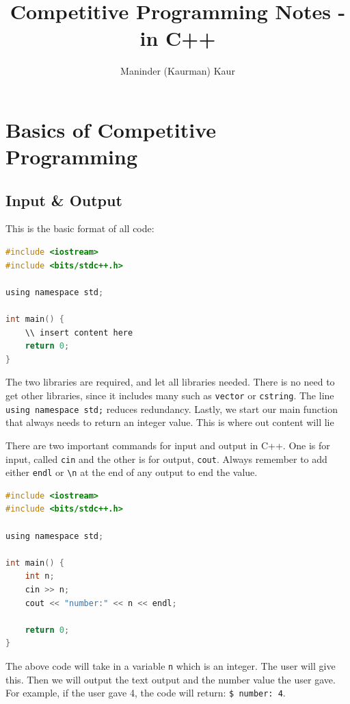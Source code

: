 \documentclass[11pt]{article}
\title{Competitive Programming Notes - in C++}
\author{Maninder (Kaurman) Kaur}
\begin{document}
\maketitle

\section{Basics of Competitive Programming}
\underline{\hspace{10cm}}

\subsection{Input \& Output}
This is the basic format of all code:
\begin{lstlisting}[language=c, mathescape=true]
#include <iostream>
#include <bits/stdc++.h>

using namespace std;

int main() {
    \\ insert content here
    return 0;
}
\end{lstlisting}

\noindent The two libraries are required, and let all libraries needed. There is no need to get other libraries, since it includes many such as \texttt{vector} or \texttt{cstring}. The line \texttt{using namespace std;} reduces redundancy. Lastly, we start our main function that always needs to return an integer value. This is where out content will lie 


\noindent There are two important commands for input and output in C++. One is for input, called \texttt{cin} and the other is for output, \texttt{cout}. Always remember to add either \texttt{endl} or \texttt{\textbackslash n} at the end of any output to end the value.

\begin{lstlisting}[language=c, mathescape=true]
#include <iostream>
#include <bits/stdc++.h>

using namespace std;

int main() {
    int n;
    cin >> n;
    cout << "number:" << n << endl;

    return 0;
}
\end{lstlisting}

\noindent The above code will take in a variable \texttt{n} which is an integer. The user will give this. Then we will output the text output and the number value the user gave. For example, if the user gave 4, the code will return: \texttt{\$ number: 4}. 
\end{document}
